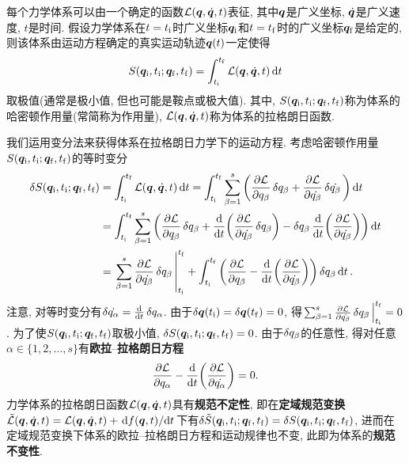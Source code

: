 \begin{postulate}[最小作用量原理]\label{pos:最小作用量原理}
    每个力学体系可以由一个确定的函数$ \mathcal{L}(\vb*{q},\dot{\vb*{q}},t) $表征, 其中$ \vb*{q} $是广义坐标, $ \dot{\vb*{q}} $是广义速度, $ t $是时间. 假设力学体系在$ t=t_{\mathrm{i}} $时广义坐标$ \vb*{q}_{\mathrm{i}} $和$ t=t_{\mathrm{f}} $时的广义坐标$ \vb*{q}_{\mathrm{f}} $是给定的, 则该体系由运动方程确定的真实运动轨迹$ \vb*{q}(t) $一定使得
    \begin{equation}
        S(\vb*{q}_{\mathrm{i}},t_{\mathrm{i}};\vb*{q}_{\mathrm{f}},t_{\mathrm{f}})=\int_{t_{\mathrm{i}}}^{t_{\mathrm{f}}} \mathcal{L}(\vb*{q},\dot{\vb*{q}},t) \dd{t}
    \end{equation}
    取极值(通常是极小值, 但也可能是鞍点或极大值). 其中, $ S(\vb*{q}_{\mathrm{i}},t_{\mathrm{i}};\vb*{q}_{\mathrm{f}},t_{\mathrm{f}}) $称为体系的哈密顿作用量(常简称为作用量), $ \mathcal{L}(\vb*{q},\dot{\vb*{q}},t) $称为体系的拉格朗日函数.
\end{postulate}

我们运用变分法来获得体系在拉格朗日力学下的运动方程. 考虑哈密顿作用量$ S(\vb*{q}_{\mathrm{i}},t_{\mathrm{i}};\vb*{q}_{\mathrm{f}},t_{\mathrm{f}}) $的等时变分
\begin{align*}
    \var{\action(\vb*{q}_{\init},t_{\init};\vb*{q}_{\fini},t_{\fini})} &=\int_{t_{\init}}^{t_{\fini}} \lagr(\vb*{q},\dot{\vb*{q}},t) \dd{t} = \int_{t_{\init}}^{t_{\fini}} \sum_{\beta=1}^s\bigg(\pdv{\lagr}{q_{\beta}}\var{q_{\beta}}+\pdv{\lagr}{\dot{q_{\beta}}}\var{\dot{q_{\beta}}}\bigg) \dd{t}\\
    &=\int_{t_{\init}}^{t_{\fini}} \sum_{\beta=1}^s\bigg(\pdv{\lagr}{q_{\beta}}\var{q_{\beta}} + \dv{t}(\pdv{\lagr}{\dot{q_{\beta}}} \var{q_{\beta}}) - \var{q_{\beta}} \dv{t}(\pdv{\lagr}{\dot{q_{\beta}}})\bigg) \dd{t}\\
    &=\eval{\sum_{\beta=1}^s \pdv{\lagr}{\dot{q_{\beta}}}\var{q_{\beta}}}_{t_{\init}}^{t_{\fini}}+\int_{t_{\init}}^{t_{\fini}} \bigg(\pdv{\lagr}{q_{\beta}} - \dv{t}(\pdv{\lagr}{\dot{q_{\beta}}})\bigg) \var{q_{\beta}} \dd{t}.
\end{align*}
注意, 对等时变分有$ \var{\dot{q_{\alpha}}} = \dv{t} \var{q_{\alpha}} $. 由于$ \var{\vb*{q}(t_{\mathrm{i}})}=\var{\vb*{q}(t_{\mathrm{f}})}=0 $, 得$ \eval{\sum_{\beta=1}^s \pdv{\lagr}{\dot{q_{\beta}}}\var{q_{\beta}}}_{t_{\init}}^{t_{\fini}}=0 $. 为了使$ S(\vb*{q}_{\mathrm{i}},t_{\mathrm{i}};\vb*{q}_{\mathrm{f}},t_{\mathrm{f}}) $取极小值, $ \var{S(\vb*{q}_{\mathrm{i}},t_{\mathrm{i}};\vb*{q}_{\mathrm{f}},t_{\mathrm{f}})}=0 $. 由于$ \var{q_{\beta}} $的任意性, 得对任意$ \alpha \in \{1,2,\ldots,s\} $有\textbf{欧拉}--\textbf{拉格朗日方程}
\begin{equation}
    \pdv{\mathcal{L}}{q_{\alpha}} - \dv{t}(\pdv{\mathcal{L}}{\dot{q_{\alpha}}}) = 0.
\end{equation}
力学体系的拉格朗日函数$ \mathcal{L}(\vb*{q},\dot{\vb*{q}},t) $具有\textbf{规范不定性}, 即在\textbf{定域规范变换}$ \tilde{\mathcal{L}}(\vb*{q},\dot{\vb*{q}},t)=\mathcal{L}(\vb*{q},\dot{\vb*{q}},t)+\dv*{f(\vb*{q},t)}{t} $下有$ \var{\tilde{S}(\vb*{q}_{\mathrm{i}},t_{\mathrm{i}};\vb*{q}_{\mathrm{f}},t_{\mathrm{f}})}=\var{S(\vb*{q}_{\mathrm{i}},t_{\mathrm{i}};\vb*{q}_{\mathrm{f}},t_{\mathrm{f}})} $, 进而在定域规范变换下体系的欧拉{--}拉格朗日方程和运动规律也不变, 此即为体系的\textbf{规范不变性}.

